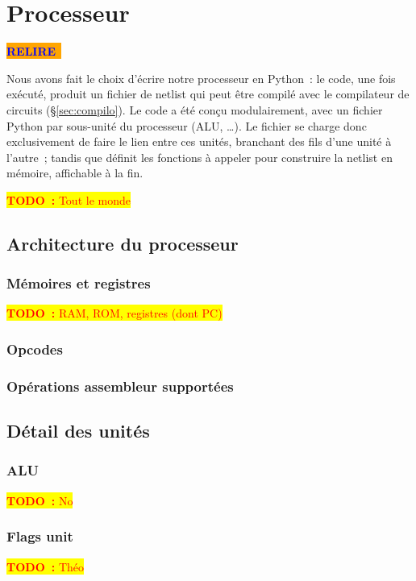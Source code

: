 \documentclass[11pt,a4paper]{article}
\newcommand{\htodo}[1]{\begin{huge}\colorbox{yellow}{\textcolor{red}{\textbf{TODO~:} #1}}\end{huge}}
\newcommand{\todo}[1]{\colorbox{yellow}{\textcolor{red}{\textbf{TODO~:} #1}}}
\newcommand{\relire}{\colorbox{orange}{\textcolor{blue}{\textbf{RELIRE}~}}}
\begin{document}
\section{Processeur} \label{sec:proc}

\relire

Nous avons fait le choix d'écrire notre processeur en Python~: le code, une fois exécuté, produit un fichier de netlist qui peut être compilé avec le compilateur de circuits (§\ref{sec:compilo}). Le code a été conçu modulairement, avec un fichier Python par sous-unité du processeur (ALU, \ldots). Le fichier  se charge donc exclusivement de faire le lien entre ces unités, \og branchant \fg{} des fils d'une unité à l'autre~; tandis que  définit les fonctions à appeler pour construire la netlist en mémoire, affichable à la fin.

\htodo{Tout le monde}

\subsection{Architecture du processeur}

\subsubsection{Mémoires et registres} \label{sssec:memory}
\todo{RAM, ROM, registres (dont PC)}
\subsubsection{Opcodes} \label{sssec:opcodes}
\subsubsection{Opérations assembleur supportées}

\subsection{Détail des unités}

\subsubsection{ALU}
\todo{No}

\subsubsection{Flags unit}
\todo{Théo}
\end{document}
